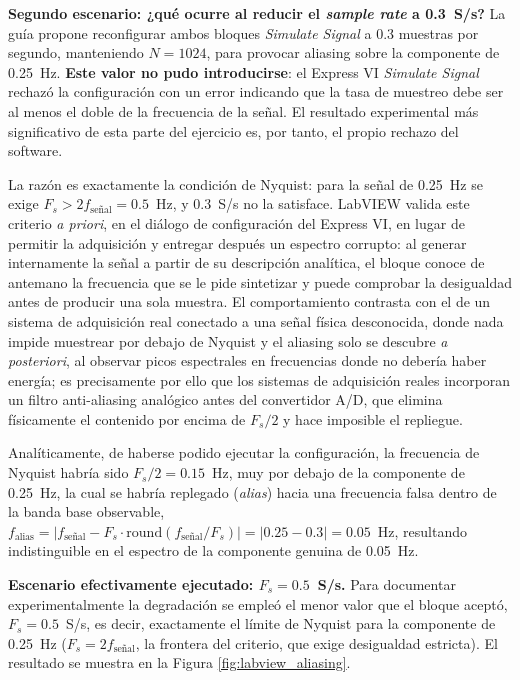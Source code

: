 \documentclass[conference]{IEEEtran}
\begin{document}
\textbf{Segundo escenario: ¿qué ocurre al reducir el \textit{sample rate} a 0.3~S/s?} La guía propone reconfigurar ambos bloques \textit{Simulate Signal} a 0.3 muestras por segundo, manteniendo $N=1024$, para provocar aliasing sobre la componente de 0.25~Hz. \textbf{Este valor no pudo introducirse}: el Express VI \textit{Simulate Signal} rechazó la configuración con un error indicando que la tasa de muestreo debe ser al menos el doble de la frecuencia de la señal. El resultado experimental más significativo de esta parte del ejercicio es, por tanto, el propio rechazo del software.

La razón es exactamente la condición de Nyquist: para la señal de 0.25~Hz se exige $F_s>2f_{\text{señal}}=0.5$~Hz, y $0.3$~S/s no la satisface. LabVIEW valida este criterio \emph{a priori}, en el diálogo de configuración del Express VI, en lugar de permitir la adquisición y entregar después un espectro corrupto: al generar internamente la señal a partir de su descripción analítica, el bloque conoce de antemano la frecuencia que se le pide sintetizar y puede comprobar la desigualdad antes de producir una sola muestra. El comportamiento contrasta con el de un sistema de adquisición real conectado a una señal física desconocida, donde nada impide muestrear por debajo de Nyquist y el aliasing solo se descubre \emph{a posteriori}, al observar picos espectrales en frecuencias donde no debería haber energía; es precisamente por ello que los sistemas de adquisición reales incorporan un filtro anti-aliasing analógico antes del convertidor A/D, que elimina físicamente el contenido por encima de $F_s/2$ y hace imposible el repliegue.

Analíticamente, de haberse podido ejecutar la configuración, la frecuencia de Nyquist habría sido $F_s/2=0.15$~Hz, muy por debajo de la componente de 0.25~Hz, la cual se habría replegado (\textit{alias}) hacia una frecuencia falsa dentro de la banda base observable, $f_{\text{alias}}=|f_{\text{señal}}-F_s\cdot\text{round}(f_{\text{señal}}/F_s)|=|0.25-0.3|=0.05$~Hz, resultando indistinguible en el espectro de la componente genuina de 0.05~Hz.

\textbf{Escenario efectivamente ejecutado: $F_s=0.5$~S/s.} Para documentar experimentalmente la degradación se empleó el menor valor que el bloque aceptó, $F_s=0.5$~S/s, es decir, exactamente el límite de Nyquist para la componente de 0.25~Hz ($F_s=2f_{\text{señal}}$, la frontera del criterio, que exige desigualdad estricta). El resultado se muestra en la Figura \ref{fig:labview_aliasing}.
\end{document}
